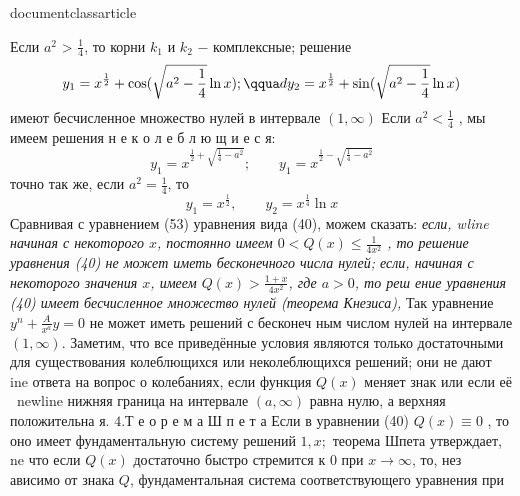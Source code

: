 documentclass{article}
\usepackage[utf8]{inputenc}
\usepackage[T1,T2A]{fontenc}
\usepackage[english,russian]{babel}
\usepackage[top=3.5 cm,bottom=2.5 cm,left=4 cm,right=4 cm,columnsep=25pt]{geome
try}
\usepackage{amsthm}
\usepackage{amssymb}
\usepackage{fancyhdr}
\newtheorem{theorem}{ТЕОРЕМА}

\setcounter{page}{256} 
\pagestyle{fancy}
\fancyhead{}
\fancyhead[LO]{\thepage}
\setlength{\headheight}{13pt}
\fancyfoot{}
Если $a^2$ > $\frac{1}{4}$, то корни $k_1$ и $k_2$ $-$ комплексные; решение
$$y_1 = x^\frac{1}{2} + \cos({\sqrt{ {a^2} - \frac{1}{4} } \ln x}) ; \qqua
d y_2 = x^\frac{1}{2} + \sin ( { \sqrt { {a^2} - \frac{1}{4} } \ln x}) $$
имеют бесчисленное множество нулей в интервале $(1, \infty)$
Если ${a^2} < \frac{1}{4}$ , мы имеем решения н е к о л е б л ю щ и е с я:
$$y_1 = {x^{ \frac{1}{2}+\sqrt{\frac{1}{4}-{a^2}}}} ; \qquad y_1 = {x^{ \frac{
1}{2}-\sqrt{\frac{1}{4}-{a^2}}}} $$
точно так же, если $a^2 = \frac{1}{4}$, то
$$y_1 = x ^\frac{1}{2} , \qquad y_2 = x^\frac{1}{4} \ln{x}$$
Сравнивая с уравнением (53) уравнения вида (40), можем сказать: \emph{если, \ne
wline
начиная с некоторого $x$, постоянно имеем ${0} < {Q(x)} \leqslant {\frac{1}{4x^
2}} $ , то решение\newline
уравнения (40) не может иметь бесконечного числа нулей; если, начиная \newline
с некоторого значения $x$, имеем $Q(x) > \frac{1+x}{4x^2}$, где $a > 0$, то реш
ение \newline
уравнения (40) имеет бесчисленное множество нулей (теорема Кнезиса), }
Так уравнение $y^n + \frac{A}{x^a} y = 0$ не может иметь решений с бесконеч
ным \newline
числом нулей на интервале $(1, \infty)$.
Заметим, что все приведённые условия являются только достаточными \newline
для существования колеблющихся или неколеблющихся решений; они не дают \newl
ine
ответа на вопрос о колебаниях, если функция $Q(x)$ меняет знак или если её \
newline
нижняя граница на интервале $(a, \infty)$ равна нулю, а верхняя положительна
я.
$4. $Т е о р е м а Ш п е т а Если в уравнении (40) $Q(x) \equiv 0 $ , то
оно \newline
имеет фундаментальную систему решений $1, x;$ теорема Шпета утверждает,
что если $Q(x)$ достаточно быстро стремится к $0$ при $x \to \infty$, то, нез
ависимо\newline
от знака $Q$, фундаментальная система соответствующего уравнения при \newline
